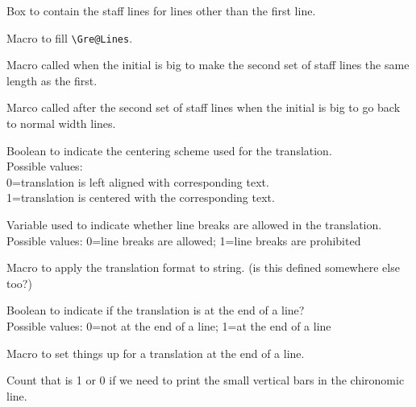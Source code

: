 Box to contain the staff lines for lines other than the first line.

Macro to fill \verb=\Gre@Lines=.

Macro called when the initial is big to make the second set of staff
lines the same length as the first.

Marco called after the second set of staff lines when the initial is
big to go back to normal width lines.

Boolean to indicate the centering scheme used for the translation.\\
Possible values:\\
0=translation is left aligned with corresponding text.\\
1=translation is centered with the corresponding text.

Variable used to indicate whether line breaks are allowed in the translation.\\
Possible values: 0=line breaks are allowed; 1=line breaks are prohibited

Macro to apply the translation format to string. (is this defined somewhere else too?)

Boolean to indicate if the translation is at the end of a line?\\
Possible values: 0=not at the end of a line; 1=at the end of a line

Macro to set things up for a translation at the end of a line.

Count that is 1 or 0 if we need to print the small vertical bars in
the chironomic line.

